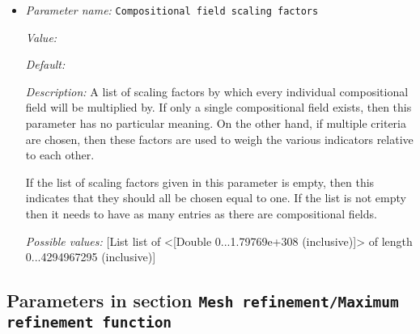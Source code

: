 \begin{itemize}
\item {\it Parameter name:} {\tt Compositional field scaling factors}
\label{parameters:Mesh refinement/Composition/Compositional field scaling factors}


{\it Value:} 


{\it Default:} 


{\it Description:} A list of scaling factors by which every individual compositional field will be multiplied by. If only a single compositional field exists, then this parameter has no particular meaning. On the other hand, if multiple criteria are chosen, then these factors are used to weigh the various indicators relative to each other. 

If the list of scaling factors given in this parameter is empty, then this indicates that they should all be chosen equal to one. If the list is not empty then it needs to have as many entries as there are compositional fields.


{\it Possible values:} [List list of <[Double 0...1.79769e+308 (inclusive)]> of length 0...4294967295 (inclusive)]
\end{itemize}

\subsection{Parameters in section \tt Mesh refinement/Maximum refinement function}
\label{parameters:Mesh_20refinement/Maximum_20refinement_20function}

